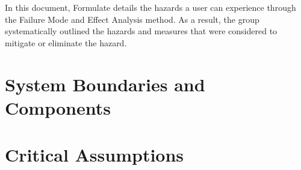 \documentclass{article}
\begin{document}
In this document, Formulate details the hazards a user can experience through the Failure Mode and Effect Analysis method. As a result, the group systematically outlined the hazards and measures that were considered to mitigate or eliminate the hazard.

\section{System Boundaries and Components}

\section{Critical Assumptions}


\newpage
\end{document}
